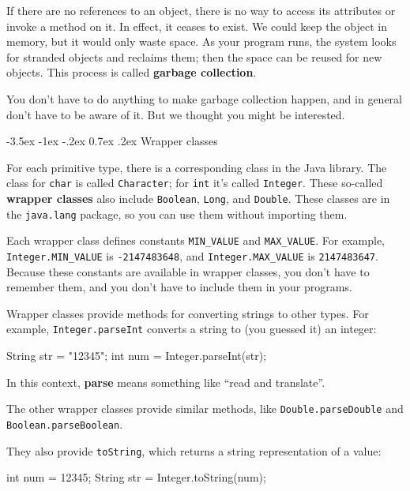 \documentclass[12pt]{book}
\makeatletter
\theoremstyle{exercise}
\newcommand{\java}[1]{\verb"#1"}
\renewcommand{\section}{\@startsection{section}{1}{\z@}%
    {-3.5ex \@plus -1ex \@minus -.2ex}%
    {0.7ex \@plus.2ex}%
    {\normalfont\Large\bfseries}}
\newcommand{\java}[1]{\lstinline{#1}} %
\makeatother
\begin{document}

If there are no references to an object, there is no way to access its attributes or invoke a method on it.
In effect, it ceases to exist.
We could keep the object in memory, but it would only waste space.
As your program runs, the system looks for stranded objects and reclaims them;
then the space can be reused for new objects.
This process is called {\bf garbage collection}.

You don't have to do anything to make garbage collection happen, and in general don't have to be aware of it.
But we thought you might be interested.


\section{Wrapper classes}
\label{wrappers}

For each primitive type, there is a corresponding class in the Java library.
The class for \java{char} is called \java{Character}; for \java{int} it's called \java{Integer}.
These so-called {\bf wrapper classes} also include \java{Boolean}, \java{Long}, and \java{Double}.
These classes are in the \java{java.lang} package, so you can use them without importing them.

Each wrapper class defines constants \java{MIN_VALUE} and \java{MAX_VALUE}.
For example, \java{Integer.MIN_VALUE} is \java{-2147483648}, and \java{Integer.MAX_VALUE} is \java{2147483647}.
Because these constants are available in wrapper classes, you don't have to remember them, and you don't have to include them in your programs.

Wrapper classes provide methods for converting strings to other types.
For example, \java{Integer.parseInt} converts a string to (you guessed it) an integer:

\begin{code}
String str = "12345";
int num = Integer.parseInt(str);
\end{code}

In this context, {\bf parse} means something like ``read and translate''.

The other wrapper classes provide similar methods, like \java{Double.parseDouble} and \java{Boolean.parseBoolean}.

They also provide \java{toString}, which returns a string representation of a value:

\begin{code}
int num = 12345;
String str = Integer.toString(num);
\end{code}
\end{document}
